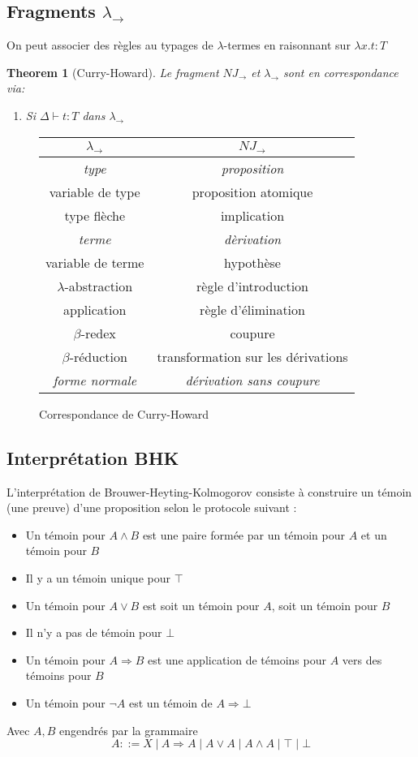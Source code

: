 \documentclass{article}
\newtheorem{thm}{Theorem}
\newcommand\lterm[2]{\lambda #1. #2}
\newcommand\tlambda[0]{$\lambda$}
\begin{document}
\subsection{Fragments $\lambda_\to$}
On peut associer des règles au typages de \tlambda-termes en raisonnant sur $\lterm{x}{t} : T$


\begin{thm}[Curry-Howard]
Le fragment $NJ_\to$ et $\lambda_\to$ sont en correspondance via:
\begin{enumerate}
\item Si $\Delta \vdash t : T$ dans $\lambda_\to$
\end{enumerate}
\end{thm}

\begin{figure}[h]
\begin{center}
\begin{tabular}{| c | c |}
\hline
$\lambda_\to$ & $NJ_\to$\\
\hline
\emph{type} & \emph{proposition}\\
\hline
variable de type & proposition atomique\\
type flèche & implication\\
\hline
\emph{terme} & \emph{dèrivation}\\
\hline
variable de terme & hypothèse\\
\tlambda-abstraction & règle d'introduction\\
application & règle d'élimination\\
$\beta$-redex & coupure\\
$\beta$-réduction & transformation sur les dérivations\\
\hline
\emph{forme normale} & \emph{dérivation sans coupure}\\
\hline
\end{tabular}
\caption{Correspondance de Curry-Howard}
\end{center}
\end{figure}


\subsection{Interprétation BHK}
L'interprétation de Brouwer-Heyting-Kolmogorov consiste à construire un témoin (une preuve) d'une proposition selon le protocole suivant :
\begin{itemize}
\item Un témoin pour $A \land B$ est une paire formée par un témoin pour $A$ et un témoin pour $B$
\item Il y a un témoin unique pour $\top$
\item Un témoin pour $A\lor B$ est soit un témoin pour $A$, soit un témoin pour $B$
\item Il n'y a pas de témoin pour $\bot$
\item Un témoin pour $A\Rightarrow B$ est une application de témoins pour $A$ vers des témoins pour $B$
\item Un témoin pour $\neg A$ est un témoin de $A \Rightarrow \bot$
\end{itemize}
Avec $A, B$ engendrés par la grammaire
\[A ::= X \;|\: A \Rightarrow A \;|\; A \lor A \;|\; A \land A \;|\; \top \;|\; \bot\]
\end{document}
